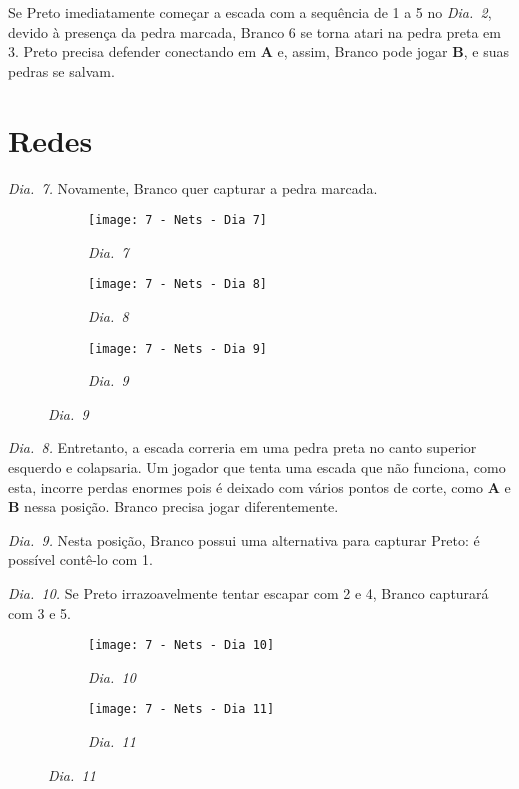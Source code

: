 Se Preto imediatamente começar a escada com a sequência de 1 a 5 no \emph{Dia.\@~2}, devido à presença da pedra marcada, Branco 6 se torna atari na pedra preta em 3. Preto precisa defender conectando em \textbf{A} e, assim, Branco pode jogar \textbf{B}, e suas pedras se salvam.

\pagebreak

\section{Redes}

\emph{Dia.\@~7.} Novamente, Branco quer capturar a pedra marcada.

\begin{figure}[h!]
    \centering
    \begin{subfigure}[t]{.31\textwidth}
        \texttt{[image: 7 - Nets - Dia 7]}
        \captionsetup{justification=centering}
        \caption*{\emph{Dia.\@~7}}
    \end{subfigure}
    \hfill
    \begin{subfigure}[t]{.31\textwidth}
        \texttt{[image: 7 - Nets - Dia 8]}
        \captionsetup{justification=centering}
        \caption*{\emph{Dia.\@~8}}
    \end{subfigure}
    \hfill
    \begin{subfigure}[t]{.31\textwidth}
        \texttt{[image: 7 - Nets - Dia 9]}
        \captionsetup{justification=centering}
        \caption*{\emph{Dia.\@~9}}
    \end{subfigure}
\end{figure}

\emph{Dia.\@~8.} Entretanto, a escada correria em uma pedra preta no canto superior esquerdo e colapsaria. Um jogador que tenta uma escada que não funciona, como esta, incorre perdas enormes pois é deixado com vários pontos de corte, como \textbf{A} e \textbf{B} nessa posição. Branco precisa jogar diferentemente.

\emph{Dia.\@~9.} Nesta posição, Branco possui uma alternativa para capturar Preto: é possível contê-lo com 1.

\emph{Dia.\@~10.} Se Preto irrazoavelmente tentar escapar com 2 e 4, Branco capturará com 3 e 5.

\begin{figure}[h!]
    \centering
    \begin{subfigure}[t]{.31\textwidth}
        \texttt{[image: 7 - Nets - Dia 10]}
        \captionsetup{justification=centering}
        \caption*{\emph{Dia.\@~10}}
    \end{subfigure}
    \hspace{1cm}
    \begin{subfigure}[t]{.31\textwidth}
        \texttt{[image: 7 - Nets - Dia 11]}
        \captionsetup{justification=centering}
        \caption*{\emph{Dia.\@~11}}
    \end{subfigure}
\end{figure}


